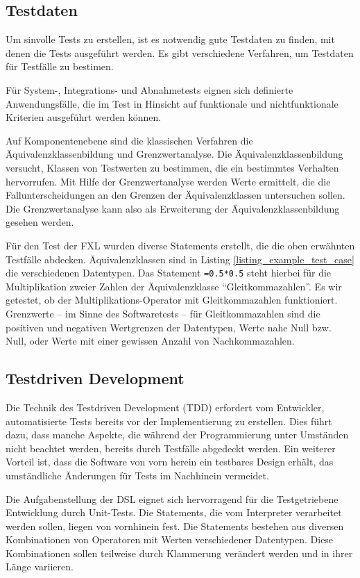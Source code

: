 \subsection{Testdaten}

Um sinvolle Tests zu erstellen, ist es not\-wen\-dig gute Testdaten zu finden, mit denen die Tests ausgeführt werden. Es gibt verschiedene Verfahren, um Testdaten für Testfälle zu bestimen.

Für System-, Integrations- und Abnahmetests eignen sich definierte Anwendungsfälle, die im Test in Hinsicht auf funktionale und nichtfunktionale Kriterien ausgeführt werden können.

Auf Komponentenebene sind die klassischen Verfahren die Äqui\-va\-lenz\-klas\-sen\-bil\-dung und Grenzwertanalyse. Die Äqui\-va\-lenz\-klas\-sen\-bil\-dung versucht, Klassen von Testwerten zu bestimmen, die ein bestimmtes Verhalten hervorrufen. Mit Hilfe der Grenzwertanalyse werden Werte ermittelt, die die Fallunterscheidungen an den Grenzen der Äqui\-va\-lenz\-klas\-sen untersuchen sollen. Die Grenzwertanalyse kann also als Erweiterung der Äqui\-va\-lenz\-klas\-sen\-bil\-dung gesehen werden.

Für den Test der FXL wurden diverse Statements erstellt, die die oben erwähnten Testfälle abdecken. Äqui\-va\-lenz\-klas\-sen sind in Listing \ref{listing_example_test_case} die verschiedenen Datentypen. Das Statement \texttt{=0.5*0.5} steht hierbei für die Multiplikation zweier Zahlen der Äqui\-va\-lenz\-klas\-se ``Gleitkommazahlen''. Es wir getestet, ob der Multiplikations-Operator mit Gleitkommazahlen funktioniert. Grenzwerte -- im Sinne des Softwaretests -- für Gleitkommazahlen sind die positiven und negativen Wertgrenzen der Datentypen, Werte nahe Null bzw. Null, oder Werte mit einer gewissen Anzahl von Nachkommazahlen.

\subsection{Testdriven Development}

Die Technik des Testdriven Development (TDD) erfordert vom Entwickler, automatisierte Tests bereits vor der Implementierung zu erstellen\cite{Beck03}. Dies führt dazu, dass manche Aspekte, die während der Programmierung unter Umständen nicht beachtet werden, bereits durch Testfälle abgedeckt werden. Ein weiterer Vorteil ist, dass die Software von vorn herein ein testbares Design erhält, das umständliche Än\-der\-ung\-en für Tests im Nachhinein vermeidet.

Die Aufgabenstellung der DSL eignet sich hervorragend für die Testgetriebene Entwicklung durch Unit-Tests. Die Statements, die vom Interpreter verarbeitet werden sollen, liegen von vornhinein fest. Die Statements bestehen aus diversen Kombinationen von Operatoren mit Werten verschiedener Datentypen. Diese Kombinationen sollen teilweise durch Klammerung verändert werden und in ihrer Länge variieren.







